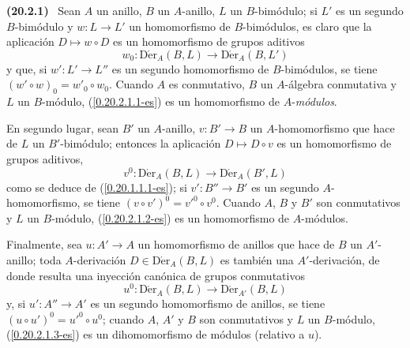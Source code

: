 \documentclass[10pt,oneside]{book}
\makeatletter
\newcommand{\sref}[1]{\textup{(\ref{#1})}}
\newcommand{\setmanualcurrentlabel}[1]{\def\@currentlabel{#1}}
\newcommand{\oldpage}[2][]{%
  \setcounter{footnote}{0}%
  \marginpar{\scriptsize\textbf{#1}~|~#2}\ignorespaces}
\newenvironment{env}[1][]{\setmanualcurrentlabel{#1}\par\medskip\noindent\textbf{(#1)}\ }{\par}
\makeatother
\begin{document}
\oldpage[0\textsubscript{IV-1}]{119}
\begin{env}[20.2.1]
\label{0.20.2.1-es}
Sean $A$ un anillo, $B$ un $A$-anillo, $L$ un $B$-bimódulo; si $L'$ es
un segundo $B$-bimódulo y $w:L\to L'$ un homomorfismo de $B$-bimódulos, es
claro que la aplicación $D\mapsto w\circ D$ es un homomorfismo de
grupos aditivos
\begin{equation}
\tag{20.2.1.1}
\label{0.20.2.1.1-es}
  w_0:\operatorname{D\acute{e}r}_A(B,L)\to\operatorname{D\acute{e}r}_A(B,L')
\end{equation}
y que, si $w':L'\to L''$ es un segundo homomorfismo de $B$-bimódulos, se tiene
$(w'\circ w)_0=w'_0\circ w_0$. Cuando $A$ es conmutativo, $B$ un
$A$-álgebra conmutativa y $L$ un $B$-módulo, \sref{0.20.2.1.1-es} es un
homomorfismo de $A$-\emph{módulos}.

En segundo lugar, sean $B'$ un $A$-anillo, $v:B'\to B$ un
$A$-homomorfismo que hace de $L$ un $B'$-bimódulo; entonces la aplicación
$D\mapsto D\circ v$ es un homomorfismo de grupos aditivos,
\begin{equation}
\tag{20.2.1.2}
\label{0.20.2.1.2-es}
  v^0:\operatorname{D\acute{e}r}_A(B,L)\to\operatorname{D\acute{e}r}_A(B',L)
\end{equation}
como se deduce de \sref{0.20.1.1.1-es}; si $v':B''\to B'$ es un segundo
$A$-homomorfismo, se tiene $(v\circ v')^0=v'^0\circ v^0$. Cuando $A$, $B$ y
$B'$ son conmutativos y $L$ un $B$-módulo, \sref{0.20.2.1.2-es} es un
homomorfismo de $A$-módulos.

Finalmente, sea $u:A'\to A$ un homomorfismo de anillos que hace de $B$ un
$A'$-anillo; toda $A$-derivación $D\in\operatorname{D\acute{e}r}_A(B,L)$ es también
una $A'$-derivación, de donde resulta una inyección canónica de grupos conmutativos
\begin{equation}
\tag{20.2.1.3}
\label{0.20.2.1.3-es}
  u^0:\operatorname{D\acute{e}r}_A(B,L)\to\operatorname{D\acute{e}r}_{A'}(B,L)
\end{equation}
y, si $u':A''\to A'$ es un segundo homomorfismo de anillos, se tiene
$(u\circ u')^0=u'^0\circ u^0$; cuando $A$, $A'$ y $B$ son conmutativos y
$L$ un $B$-módulo, \sref{0.20.2.1.3-es} es un dihomomorfismo de módulos
(relativo a $u$).


\end{env}
\end{document}
